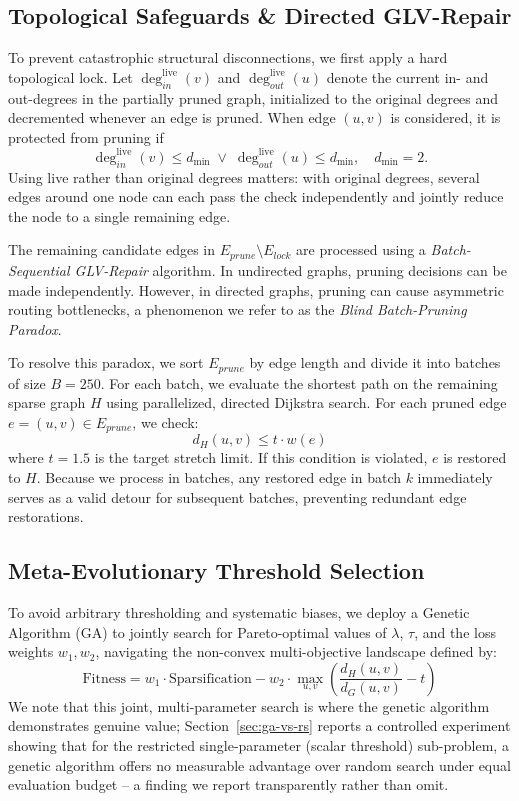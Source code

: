 \documentclass[journal]{IEEEtran}
\begin{document}
\subsection{Topological Safeguards \& Directed GLV-Repair}
To prevent catastrophic structural disconnections, we first apply a hard topological lock. Let $\deg^{\mathrm{live}}_{in}(v)$ and $\deg^{\mathrm{live}}_{out}(u)$ denote the current in- and out-degrees in the partially pruned graph, initialized to the original degrees and decremented whenever an edge is pruned. When edge $(u,v)$ is considered, it is protected from pruning if
\begin{equation}
    \deg^{\mathrm{live}}_{in}(v) \le d_{\min} \;\lor\; \deg^{\mathrm{live}}_{out}(u) \le d_{\min}, \quad d_{\min} = 2.
\end{equation}
Using live rather than original degrees matters: with original degrees, several edges around one node can each pass the check independently and jointly reduce the node to a single remaining edge.

The remaining candidate edges in $E_{prune} \setminus E_{lock}$ are processed using a \textit{Batch-Sequential GLV-Repair} algorithm. In undirected graphs, pruning decisions can be made independently. However, in directed graphs, pruning can cause asymmetric routing bottlenecks, a phenomenon we refer to as the \textit{Blind Batch-Pruning Paradox}.

To resolve this paradox, we sort $E_{prune}$ by edge length and divide it into batches of size $B = 250$. For each batch, we evaluate the shortest path on the remaining sparse graph $H$ using parallelized, directed Dijkstra search. For each pruned edge $e = (u, v) \in E_{prune}$, we check:
\begin{equation}
    d_H(u, v) \le t \cdot w(e)
\end{equation}
where $t = 1.5$ is the target stretch limit. If this condition is violated, $e$ is restored to $H$. Because we process in batches, any restored edge in batch $k$ immediately serves as a valid detour for subsequent batches, preventing redundant edge restorations.

\subsection{Meta-Evolutionary Threshold Selection}
To avoid arbitrary thresholding and systematic biases, we deploy a Genetic Algorithm (GA) to jointly search for Pareto-optimal values of $\lambda$, $\tau$, and the loss weights $w_1, w_2$, navigating the non-convex multi-objective landscape defined by:
\begin{equation}
    \text{Fitness} = w_1 \cdot \text{Sparsification} - w_2 \cdot \max_{u,v} \left( \frac{d_H(u,v)}{d_G(u,v)} - t \right)
\end{equation}
We note that this joint, multi-parameter search is where the genetic algorithm demonstrates genuine value; Section~\ref{sec:ga-vs-rs} reports a controlled experiment showing that for the restricted single-parameter (scalar threshold) sub-problem, a genetic algorithm offers no measurable advantage over random search under equal evaluation budget -- a finding we report transparently rather than omit.
\end{document}
